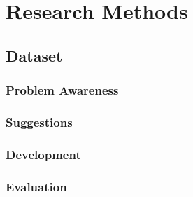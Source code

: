 \chapter{Research Methods}\label{chap:research-methods}

\section{Dataset}\label{sec:dataset}


\subsection{Problem Awareness}

\subsection{Suggestions}

\subsection{Development}

\subsection{Evaluation}